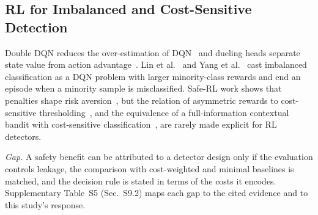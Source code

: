 \subsection{RL for Imbalanced and Cost-Sensitive Detection}
Double DQN reduces the over-estimation of DQN~\cite{mnih2015human,vanhasselt2016double} and dueling heads separate state value from action advantage~\cite{wang2016dueling}. Lin et al.~\cite{lin2020imbalanced} and Yang et al.~\cite{yang2024drlimbalanced} cast imbalanced classification as a DQN problem with larger minority-class rewards and end an episode when a minority sample is misclassified. Safe-RL work shows that penalties shape risk aversion~\cite{garcia2015safe}, but the relation of asymmetric rewards to cost-sensitive thresholding~\cite{elkan2001cost}, and the equivalence of a full-information contextual bandit with cost-sensitive classification~\cite{dudik2011efficient}, are rarely made explicit for RL detectors.

\emph{Gap.} A safety benefit can be attributed to a detector design only if the evaluation controls leakage, the comparison with cost-weighted and minimal baselines is matched, and the decision rule is stated in terms of the costs it encodes. Supplementary Table~S5 (Sec.~S9.2) maps each gap to the cited evidence and to this study's response.
